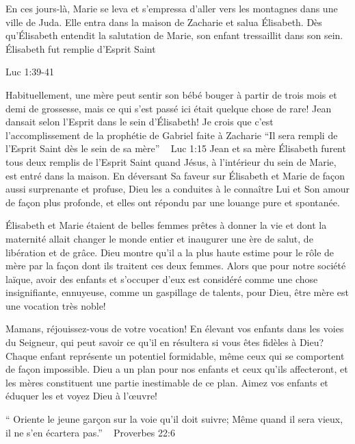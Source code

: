 

\epigraph{
En ces jours-là, Marie se leva et s’empressa d’aller vers les montagnes dans une ville de Juda. Elle entra dans la maison de Zacharie et salua Élisabeth. Dès qu’Élisabeth entendit la salutation de Marie, son enfant tressaillit dans son sein. Élisabeth fut remplie d’Esprit Saint}{Luc 1:39-41}

Habituellement, une mère peut sentir son bébé bouger à partir de trois mois et demi de grossesse, mais ce qui s'est passé ici était quelque chose de rare! Jean dansait selon l'Esprit dans le sein d'Élisabeth! Je crois que c'est l'accomplissement de la prophétie de Gabriel faite à Zacharie “Il sera rempli de l’Esprit Saint dès le sein de sa mère”
                                                                         ~ Luc 1:15
Jean et sa mère Élisabeth furent tous deux remplis de l'Esprit Saint quand Jésus, à l'intérieur du sein de Marie, est entré dans la maison. En déversant Sa faveur sur Élisabeth et Marie de façon aussi surprenante et profuse, Dieu les a conduites à le connaître Lui et Son amour de façon plus profonde, et elles ont répondu par une louange pure et spontanée.

Élisabeth et Marie étaient de belles femmes prêtes à donner la vie et dont la maternité allait changer le monde entier et inaugurer une ère de salut, de libération et de grâce. Dieu montre qu'il a la plus haute estime pour le rôle de mère par la façon dont ils traitent ces deux femmes. Alors que pour notre société laïque, avoir des enfants et s'occuper d'eux est considéré comme une chose insignifiante, ennuyeuse, comme un gaspillage de talents, pour Dieu, être mère est une vocation très noble!

Mamans, réjouissez-vous de votre vocation! En élevant vos enfants dans les voies du Seigneur, qui peut savoir ce qu'il en résultera si vous êtes fidèles à Dieu? Chaque enfant représente un potentiel formidable, même ceux qui se comportent de façon impossible. Dieu a un plan pour nos enfants et ceux qu'ils affecteront, et les mères constituent une partie inestimable de ce plan. Aimez vos enfants et éduquer les et voyez Dieu à l'œuvre!

“ Oriente le jeune garçon sur la voie qu’il doit suivre; Même quand il sera vieux, il ne s’en écartera pas.” ~ Proverbes 22:6

